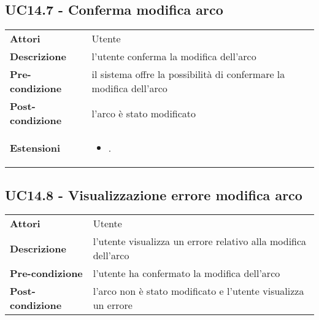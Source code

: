 \subsection{UC14.7 - Conferma modifica arco}
\label{sssec:UC14.7}
\def\arraystretch{1.5}
\begin{tabularx}{\textwidth}{l|p{}}
\rowcolor{I} \multicolumn{2}{c}{\color{white}\textbf{UC14.7 - Conferma modifica arco}} \\
\toprule
\endhead
\textbf{Attori} & Utente\\
\textbf{Descrizione} & l'utente conferma la modifica dell'arco\\
\textbf{Pre-condizione} & il sistema offre la possibilità di confermare la modifica dell'arco\\
\textbf{Post-condizione} & l'arco è stato modificato\\
\textbf{Estensioni} & \vspace{-1.2em}\begin{itemize}[leftmargin=*,noitemsep,nosep]
\item \nameref{sssec:UC14.8}.
\end{itemize}\\
\bottomrule
\end{tabularx}
\subsection{UC14.8 - Visualizzazione errore modifica arco}
\label{sssec:UC14.8}
\def\arraystretch{1.5}
\begin{tabularx}{\textwidth}{l|p{}}
\rowcolor{I} \multicolumn{2}{c}{\color{white}\textbf{UC14.8 - Visualizzazione errore modifica arco}} \\
\toprule
\endhead
\textbf{Attori} & Utente\\
\textbf{Descrizione} & l'utente visualizza un errore relativo alla modifica dell'arco\\
\textbf{Pre-condizione} & l'utente ha confermato la modifica dell'arco\\
\textbf{Post-condizione} & l'arco non è stato modificato e l'utente visualizza un errore\\
\bottomrule
\end{tabularx}
